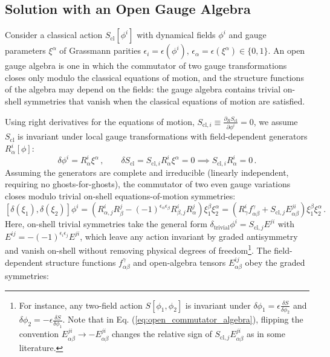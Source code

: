 \subsection{Solution with an Open Gauge Algebra}

Consider a classical action \(S_{\text{cl}}[\phi^i]\) with dynamical fields \(\phi^i\) and gauge parameters \(\xi^\alpha\) of Grassmann parities \(\epsilon_i = \epsilon(\phi^i), \, \epsilon_\alpha = \epsilon(\xi^\alpha) \in \{0, 1\}\). An open gauge algebra is one in which the commutator of two gauge transformations closes only modulo the classical equations of motion, and the structure functions of the algebra may depend on the fields: the gauge algebra contains trivial on-shell symmetries that vanish when the classical equations of motion are satisfied.

Using right derivatives for the equations of motion, \(S_{\text{cl}, i} \equiv \frac{\partial_R S_{\text{cl}}}{\partial \phi^i} = 0\), we assume \(S_{\text{cl}}\) is invariant under local gauge transformations with field-dependent generators \(R^i_\alpha[\phi]\):
\begin{equation} \label{eq:open_algebra_gauge_sym}
    \delta \phi^i = R^i_\alpha \xi^\alpha \, , \qquad \delta S_{\text{cl}} = S_{\text{cl}, i} R^i_\alpha \xi^\alpha = 0 \implies S_{\text{cl}, i} R^i_\alpha = 0 \, .
\end{equation}
Assuming the generators are complete and irreducible (linearly independent, requiring no ghosts-for-ghosts), the commutator of two even gauge variations closes modulo trivial on-shell equations-of-motion symmetries:
\begin{equation} \label{eq:open_commutator_algebra}
    [\delta(\xi_1), \delta(\xi_2)] \phi^i = \left( R^i_{\alpha, j} R^j_\beta - (-1)^{\epsilon_\alpha \epsilon_\beta} R^i_{\beta, j} R^j_\alpha \right) \xi_1^\beta \xi_2^\alpha = \left( R^i_\gamma f^\gamma_{\alpha\beta} + S_{\text{cl}, j} E^{ji}_{\alpha\beta} \right) \xi_1^\beta \xi_2^\alpha \, .
\end{equation}
Here, on-shell trivial symmetries take the general form \(\delta_{\text{trivial}}\phi^i = S_{\text{cl}, j} E^{ji}\) with \(E^{ij} = -(-1)^{\epsilon_i \epsilon_j} E^{ji}\), which leave any action invariant by graded antisymmetry and vanish on-shell without removing physical degrees of freedom\footnote{For instance, any two-field action \(S[\phi_1, \phi_2]\) is invariant under \(\delta\phi_1 = \epsilon \frac{\delta S}{\delta \phi_2}\) and \(\delta\phi_2 = -\epsilon \frac{\delta S}{\delta \phi_1}\). Note that in Eq. (\ref{eq:open_commutator_algebra}), flipping the convention \(E^{ji}_{\alpha\beta} \rightarrow -E^{ji}_{\alpha\beta}\) changes the relative sign of \(S_{\text{cl}, j} E^{ji}_{\alpha\beta}\) as in some literature.}. The field-dependent structure functions \(f^\gamma_{\alpha\beta}\) and open-algebra tensors \(E^{ij}_{\alpha\beta}\) obey the graded symmetries:
